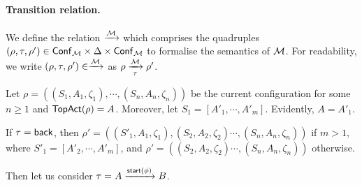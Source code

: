 \paragraph{Transition relation.} We define the relation $\xrightarrow{{\mathcal{M} }} $ which comprises the quadruples $(\rho, \tau, \rho') \in {\mathsf{Conf} }_{\mathcal{M} } \times \Delta  \times {\mathsf{Conf} }_{\mathcal{M} }$ 
to formalise the semantics of ${\mathcal{M} }$. For readability, 
we write $(\rho, \tau, \rho')\in \xrightarrow{{\mathcal{M} }}$  as $\rho \xrightarrow[\tau]{{\mathcal{M} }} \rho'$.

Let $\rho = ((S_1, A_1, \zeta_1), \cdots, (S_n, A_n, \zeta_n))$ be the current configuration for some $n \ge 1$ and $\mathsf{TopAct}(\rho) = A$. Moreover, let $S_1 = [A'_1, \cdots, A'_m]$. Evidently, $A = A'_1$.

If $\tau = {\mathsf{back} }$, then $\rho' = ((S'_1, A_1, \zeta_1), (S_2, A_2, \zeta_2) \cdots, (S_n, A_n, \zeta_n))$ if $m > 1$, where $S'_1 = [A'_2, \cdots, A'_m]$, and $\rho' = ((S_2, A_2, \zeta_2) \cdots, (S_n, A_n, \zeta_n))$ otherwise. 

Then let us consider $\tau = A\xrightarrow{{\mathsf{start} }(\phi)}B$. 



